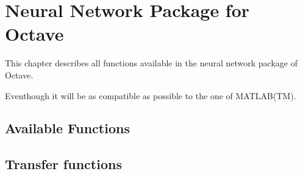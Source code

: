 \chapter{Neural Network Package for Octave}
This chapter describes all functions available in the neural network package of Octave.

Eventhough it will be as compatible as possible to the one of MATLAB(TM).

\section{Available Functions}











\section{Transfer functions}




